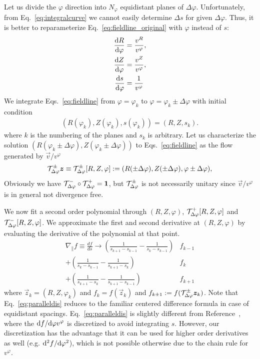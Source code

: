 Let us divide the $\varphi$ direction into $N_\varphi$ equidistant planes of
$\Delta \varphi$. Unfortunately, from Eq.~\eqref{eq:integralcurve} we cannot easily determine
$\Delta s$ for given $\Delta \varphi$.
Thus, it is better to reparameterize Eq.~\eqref{eq:fieldline_original} with $\varphi$ instead of $s$:
\begin{subequations}
\begin{align}
    \frac{\d R}{\d\varphi}&= \frac{v^R}{v^\varphi},\\ %
    \frac{\d Z}{\d\varphi}&=\frac{v^Z}{v^\varphi},\\%
    \frac{\d s}{\d\varphi}&=\frac{1}{v^\varphi}
\end{align}
\label{eq:fieldline}
\end{subequations}
We integrate Eqs.~\eqref{eq:fieldline} from $\varphi=\varphi_k$ to $\varphi=\varphi_k\pm \Delta \varphi$
with initial condition
\begin{align}
    (R(\varphi_k), Z(\varphi_k), s(\varphi_k) ) = (R, Z, s_k).
    \label{}
\end{align}
where $k$ is the numbering of the planes and $s_k$ is arbitrary.
Let us characterize the solution $(R(\varphi_k\pm \Delta \varphi), Z(\varphi_k\pm \Delta \varphi))$ to Eqs.~\eqref{eq:fieldline} as the flow generated by $\vec v/v^\varphi$
\begin{align}
    \mathcal T^\pm_{\Delta\varphi}{\boldsymbol{z}} \equiv \mathcal T^\pm_{\Delta\varphi}[R, Z, \varphi]:= ( R(\pm \Delta\varphi), Z( \pm \Delta\varphi), \varphi\pm\Delta \varphi),
    \label{}
\end{align}
Obviously we have $\mathcal T^-_{\Delta\varphi}\circ\mathcal T^+_{\Delta\varphi} = \mathbf{1}$, but $\mathcal T^\pm_{\Delta\varphi}$ is not necessarily unitary since $\vec v/v^\varphi$ is in general
not divergence free.

We now fit a second order polynomial through $(R,Z,\varphi)$, $\mathcal T^+_{\Delta\varphi} [R,Z,\varphi]$ and $\mathcal T^-_{\Delta\varphi}[R,Z,\varphi]$. We approximate the first and second derivative at $(R,Z,\varphi)$ by evaluating the derivative of the
polynomial at that point.
\begin{align} \label{eq:paralleldis}
    \nabla_\parallel f \equiv \frac{df}{ds}
    \rightarrow
    \left(\frac{ 1}{s_{k+1}-s_{k-1}} - \frac{1}{s_k - s_{k-1}}\right) &f_{k-1}  \nonumber\\
    +\left(\frac{ 1}{s_{k}-s_{k-1}} - \frac{1}{s_{k+1} - s_{k}}\right) &f_k\nonumber\\
    +\left(\frac{ 1}{s_{k+1}-s_{k}} - \frac{1}{s_{k+1} - s_{k-1}}\right) &f_{k+1}
\end{align}
where $\vec z_k = (R,Z,\varphi_k)$ and $f_k = f(\vec z_k)$
and $f_{k\pm 1} := f(\mathcal T^\pm_{\Delta\varphi} {\boldsymbol{z}}_k)$.
Note that Eq.~\eqref{eq:paralleldis} reduces to
the familiar centered difference formula in case of equidistant spacings.
Eq.~\eqref{eq:paralleldis} is slightly different from Reference~\cite{Hariri2014}, where the $\mathrm{d} f/\mathrm{d}\varphi v^\varphi$ is discretized to avoid integrating $s$.
However, our discretization has the advantage that it can be used for higher
order derivatives as well (e.g. $\mathrm{d}^2f/\mathrm{d} \varphi^2$), which is not possible otherwise due to the chain rule
for $v^\varphi$.

